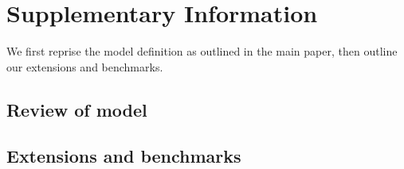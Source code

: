\documentclass{article}
\begin{document}
\newcommand\structabs[5]{\maketitle \abstract{#1 #2 #3 Contact: #4}}

\title{\longtitle}
\author{\shortauthors}
\maketitle

\section*{Supplementary Information}

We first reprise the model definition as outlined in the main paper, then outline our extensions and benchmarks.

\subsection*{Review of model}





\subsection*{Extensions and benchmarks}





\end{document}
